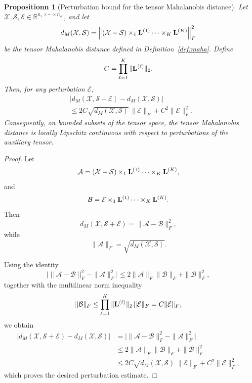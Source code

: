 \documentclass[10pt,a4paper]{amsart}
\newtheorem{proposition}{Propositionn}
\newcommand{\T}{\mathcal}
\newcommand{\m}[1]{{\bf{#1}}}
\begin{document}
\begin{proposition}[Perturbation bound for the tensor Mahalanobis distance]
	\label{prop:perturb}
	Let $\T X,\T S,\T E\in
	\mathbb R^{n_1\times\cdots\times n_K}$, and let
	\[
	d_M(\T X,\T S)
	=
	\Big\|
	(\T X-\T S)
	\times_1\m L^{(1)}
	\cdots
	\times_K\m L^{(K)}
	\Big\|_F^2
	\]
	be the tensor Mahalanobis distance defined in
	Definition~\ref{def:maha}. Define
	\[
	C=\prod_{\ell=1}^K\|\m L^{(\ell)}\|_2.
	\]
	Then, for any perturbation $\T E$,
	\[
	\begin{aligned}
		&
		\left|
		d_M(\T X,\T S+\T E)
		-
		d_M(\T X,\T S)
		\right|
		\\
		&\le
		2C
		\sqrt{d_M(\T X,\T S)}
		\,\|\T E\|_F
		+
		C^2
		\|\T E\|_F^2.
	\end{aligned}
	\]
Consequently, on bounded subsets of the tensor space, the tensor Mahalanobis distance is locally Lipschitz continuous with respect to perturbations of the auxiliary tensor.
\end{proposition}

\begin{proof}
	Let
	\[
	\T A=
	(\T X-\T S)
	\times_1\m L^{(1)}
	\cdots
	\times_K\m L^{(K)},
	\]
	and
	\[
	\T B=
	\T E
	\times_1\m L^{(1)}
	\cdots
	\times_K\m L^{(K)}.
	\]
	Then
	\[
	d_M(\T X,\T S+\T E)
	=
	\|\T A-\T B\|_F^2,
	\]
	while
	\[
	\|\T A\|_F
	=
	\sqrt{d_M(\T X,\T S)}.
	\]
	
	Using the identity
	\[
	\bigl|
	\|\T A-\T B\|_F^2-\|\T A\|_F^2
	\bigr|
	\le
	2\|\T A\|_F\|\T B\|_F+\|\T B\|_F^2,
	\]
	together with the multilinear norm inequality
	\[
	\|\T B\|_F
	\le
	\prod_{\ell=1}^K
	\|\m L^{(\ell)}\|_2
	\,
	\|\T E\|_F
	=
	C\|\T E\|_F,
	\]
	we obtain
	\[
	\begin{aligned}
		\left|
		d_M(\T X,\T S+\T E)
		-
		d_M(\T X,\T S)
		\right|
		&=
		\bigl|
		\|\T A-\T B\|_F^2-\|\T A\|_F^2
		\bigr|\\
		&\le
		2\|\T A\|_F\|\T B\|_F+\|\T B\|_F^2\\
		&\le
		2C\sqrt{d_M(\T X,\T S)}\,\|\T E\|_F
		+
		C^2\|\T E\|_F^2,
	\end{aligned}
	\]
	which proves the desired perturbation estimate.
	\end{proof}
\end{document}
